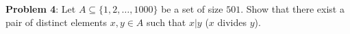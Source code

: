 \documentclass{amsart}
\begin{document}
	
	\noindent \textbf{Problem 4}: Let $A\subseteq \{1,2,\dots,1000\}$ be a set of size $501$. Show that there exist a pair of distinct elements $x,y\in A$ such that $x|y$ ($x$ divides $y$).\\
	
	
%	
	
%	
	
\end{document}
